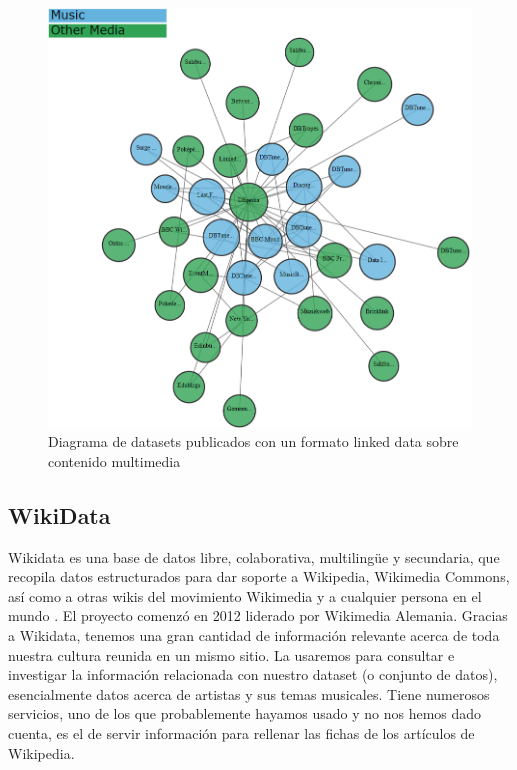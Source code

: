 \begin{figure}[h!]
	\centering
	\includegraphics[width = 1\textwidth]{Imagenes/Bitmap/WIkis.png}
	\caption{Diagrama de datasets publicados con un formato linked data sobre contenido multimedia \cite{lodcloud}}
	\label{fig:sampleImage}
\end{figure}


\subsection{WikiData}

Wikidata es una base de datos libre, colaborativa, multilingüe y secundaria, que recopila datos estructurados para dar soporte a Wikipedia, Wikimedia Commons, así como a otras wikis del movimiento Wikimedia y a cualquier persona en el mundo \cite{wikidataIntro}. El proyecto comenzó en 2012 liderado por Wikimedia Alemania. Gracias a Wikidata, tenemos una gran cantidad de información relevante acerca de toda nuestra cultura reunida en un mismo sitio. La usaremos para consultar e investigar la información relacionada con nuestro dataset (o conjunto de datos), esencialmente datos acerca de artistas y sus temas musicales. Tiene numerosos servicios, uno de los que probablemente hayamos usado y no nos hemos dado cuenta, es el de servir información para rellenar las fichas de los artículos de Wikipedia.\\


